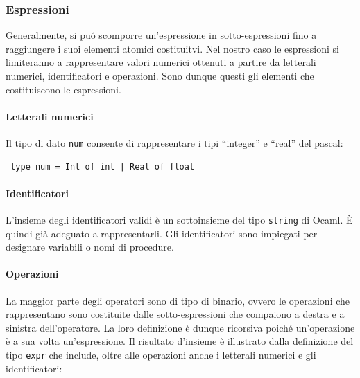 \documentclass[a4paper,10pt]{article}
\begin{document}
\subsubsection{Espressioni}
Generalmente, si pu\'o scomporre un'espressione in sotto-espressioni fino a
raggiungere i suoi elementi atomici costituitvi. Nel nostro caso le espressioni
si limiteranno a rappresentare valori numerici ottenuti a partire da letterali
numerici, identificatori e operazioni.
Sono dunque questi gli elementi che costituiscono le espressioni.

\paragraph{Letterali numerici}
Il tipo di dato \verb|num| consente di rappresentare i tipi ``integer'' e
``real'' del pascal:
\begin{verbatim}
 type num = Int of int | Real of float
\end{verbatim}

\paragraph{Identificatori}
L'insieme degli identificatori validi \`e un sottoinsieme del tipo \verb|string|
di Ocaml. \`E quindi gi\`a adeguato a rappresentarli. Gli identificatori sono
impiegati per designare variabili o nomi di procedure.

\paragraph{Operazioni}
La maggior parte degli operatori sono di tipo di binario, ovvero le
operazioni che rappresentano sono costituite dalle sotto-espressioni che
compaiono a destra e a sinistra dell'operatore. La loro definizione \`e dunque
ricorsiva poich\'e un'operazione \`e a sua volta un'espressione.
Il risultato d'insieme \`e illustrato dalla definizione del tipo \verb|expr|
che include, oltre alle operazioni anche i letterali numerici e gli
identificatori:\\
\end{document}

